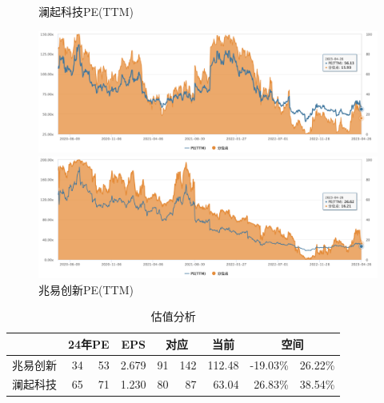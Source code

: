 \documentclass[a4paper,12pt]{ctexart}
\begin{document}
\begin{figure}[H]
    \begin{minipage}{0.48\linewidth}
        \caption{澜起科技PE(TTM)}
        \centering
        \includegraphics[width=\linewidth]{img/pe-lq.png}
    \end{minipage}
    \begin{minipage}{0.48\linewidth}
        \caption{兆易创新PE(TTM)}
        \centering
        \includegraphics[width=\linewidth]{img/pe-zy.png}
    \end{minipage}
\end{figure}
\begin{table}[H]
    \caption{估值分析}
    \centering
    \begin{tabular}{|l|rr|r|rr|r|rr|}
        \hline
             & \multicolumn{2}{c|}{24年PE} & \multicolumn{1}{c|}{EPS} & \multicolumn{2}{c|}{对应} & \multicolumn{1}{c|}{当前} & \multicolumn{2}{c|}{空间}                                                    \\ \hline
        兆易创新 & \multicolumn{1}{r|}{34}    & 53                       & 2.679                   & \multicolumn{1}{r|}{91} & 142                     & 112.48 & \multicolumn{1}{r|}{-19.03\%} & 26.22\% \\ \hline
        澜起科技 & \multicolumn{1}{r|}{65}    & 71                       & 1.230                   & \multicolumn{1}{r|}{80} & 87                      & 63.04  & \multicolumn{1}{r|}{26.83\%}  & 38.54\% \\ \hline
    \end{tabular}
\end{table}
\end{document}
